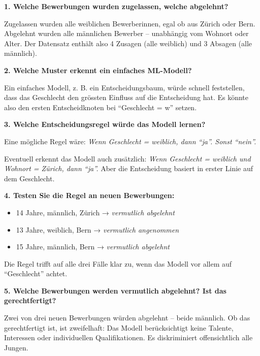 \begin{aufgabe}{6}

\textbf{1. Welche Bewerbungen wurden zugelassen, welche abgelehnt?}

Zugelassen wurden alle weiblichen Bewerberinnen, egal ob aus Zürich oder Bern. Abgelehnt wurden alle männlichen Bewerber – unabhängig vom Wohnort oder Alter.  
Der Datensatz enthält also 4 Zusagen (alle weiblich) und 3 Absagen (alle männlich).

\vspace{0.5em}
\textbf{2. Welche Muster erkennt ein einfaches ML-Modell?}

Ein einfaches Modell, z. B. ein Entscheidungsbaum, würde schnell feststellen, dass das Geschlecht den grössten Einfluss auf die Entscheidung hat. Es könnte also den ersten Entscheidknoten bei ``Geschlecht = w'' setzen.

\vspace{0.5em}
\textbf{3. Welche Entscheidungsregel würde das Modell lernen?}

Eine mögliche Regel wäre:  
\textit{Wenn Geschlecht = weiblich, dann ``ja''. Sonst ``nein''.}

Eventuell erkennt das Modell auch zusätzlich:  
\textit{Wenn Geschlecht = weiblich und Wohnort = Zürich, dann ``ja''.}  
Aber die Entscheidung basiert in erster Linie auf dem Geschlecht.

\vspace{0.5em}
\textbf{4. Testen Sie die Regel an neuen Bewerbungen:}

\begin{itemize}
  \item 14 Jahre, männlich, Zürich → \textit{vermutlich abgelehnt}
  \item 13 Jahre, weiblich, Bern → \textit{vermutlich angenommen}
  \item 15 Jahre, männlich, Bern → \textit{vermutlich abgelehnt}
\end{itemize}

Die Regel trifft auf alle drei Fälle klar zu, wenn das Modell vor allem auf ``Geschlecht'' achtet.

\vspace{0.5em}
\textbf{5. Welche Bewerbungen werden vermutlich abgelehnt? Ist das gerechtfertigt?}

Zwei von drei neuen Bewerbungen würden abgelehnt – beide männlich.  
Ob das gerechtfertigt ist, ist zweifelhaft: Das Modell berücksichtigt keine Talente, Interessen oder individuellen Qualifikationen. Es diskriminiert offensichtlich alle Jungen.


\end{aufgabe}
